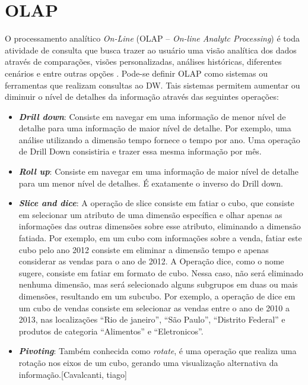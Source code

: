 \section{OLAP}
\label{sec-olap}

%

O processamento analítico \emph{On-Line} (OLAP – \emph{On-line Analytc Processing}) é toda atividade de consulta que busca trazer ao usuário uma visão analítica dos dados através de comparações, visões personalizadas, análises históricas, diferentes cenários e entre outras opções \cite{kimball2002}. Pode-se definir OLAP como sistemas ou ferramentas que realizam consultas ao DW. Tais sistemas permitem aumentar ou diminuir o nível de detalhes da informação através das seguintes operações:

%

\begin{itemize}
\item \textbf{\emph{Drill down}}: Consiste em navegar em uma informação de menor nível de detalhe para uma informação de maior nível de detalhe. Por exemplo, uma análise utilizando a dimensão tempo fornece o tempo por ano. Uma operação de Drill Down consistiria e trazer essa mesma informação por mês.
\item \textbf{\emph{Roll up}}: Consiste em navegar em uma informação de maior nível de detalhe para um menor nível de detalhes. É exatamente o inverso do Drill down.
\item \textbf{\emph{Slice and dice}}: A operação de slice consiste em fatiar o cubo, que consiste em selecionar um atributo de uma dimensão específica e olhar apenas as informações das outras dimensões sobre esse atributo, eliminando a dimensão fatiada. Por exemplo, em um cubo com informações sobre a venda,  fatiar este cubo pelo ano 2012 consiste em eliminar a dimensão tempo e apenas considerar as vendas para o ano de 2012. A Operação dice, como o nome sugere, consiste em fatiar em formato de cubo. Nessa caso, não será eliminado nenhuma dimensão, mas será selecionado alguns subgrupos em duas ou mais dimensões, resultando em um subcubo. Por exemplo,  a operação de dice em um cubo de vendas consiste em selecionar as vendas entre o ano de 2010 a 2013, nas localizações “Rio de janeiro”, “São Paulo”, “Distrito Federal” e produtos de categoria “Alimentos” e “Eletronicos”.
\item \textbf{\emph{Pivoting}}: Também conhecida como \emph{rotate}, é uma operação que realiza uma rotação nos eixos de um cubo, gerando uma visualização alternativa da informação.[Cavalcanti, tiago]
\end{itemize}

